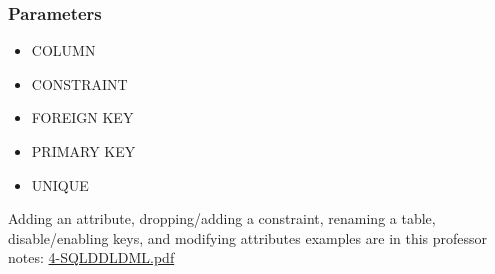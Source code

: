 \documentclass[twoside]{article}
\begin{document}
\subsubsection*{Parameters}
\begin{itemize}
    \item COLUMN
    \item CONSTRAINT
    \item FOREIGN KEY
    \item PRIMARY KEY
    \item UNIQUE
\end{itemize}

Adding an attribute, dropping/adding a constraint, renaming a table, disable/enabling
keys, and modifying attributes examples are in this professor notes: \url{4-SQLDDLDML.pdf}

\newpage
\hfill \break 
{}
\end{document}
